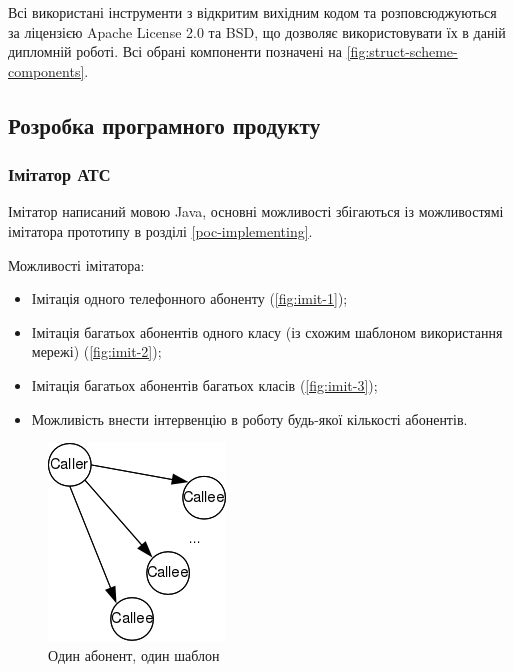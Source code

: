 Всі використані інструменти з відкритим вихідним кодом та розповсюджуються за ліцензією Apache License 2.0 та BSD, що дозволяє використовувати їх в даній дипломній роботі. Всі обрані компоненти позначені на \autoref{fig:struct-scheme-components}.

\subsection{Розробка програмного продукту}

\subsubsection{Імітатор АТС}

Імітатор написаний мовою Java, основні можливості збігаються із можливостямі імітатора прототипу в розділі \ref{poc-implementing}.

Можливості імітатора:
\begin{itemize}
  \item Імітація одного телефонного абоненту (\autoref{fig:imit-1});
  \item Імітація багатьох абонентів одного класу (із схожим шаблоном використання мережі) (\autoref{fig:imit-2});
  \item Імітація багатьох абонентів багатьох класів (\autoref{fig:imit-3});
  \item Можливість внести інтервенцію в роботу будь-якої кількості абонентів.
\end{itemize}

\begin{figure}[h]
        \begin{center}
            \includegraphics[scale=0.8]{resources/imit-1.png}
        \end{center}
        \caption{Один абонент, один шаблон}
        \label{fig:imit-1}
\end{figure}

